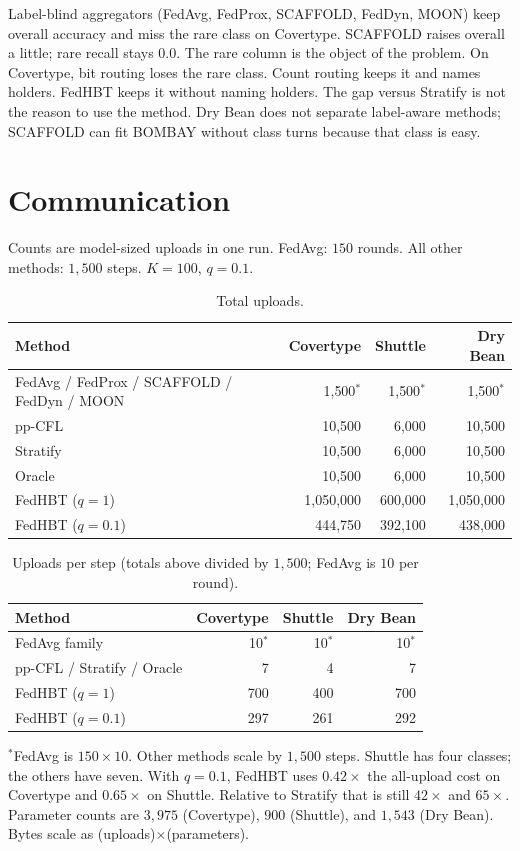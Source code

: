 \documentclass[11pt,a4paper]{article}
\theoremstyle{plain}
\begin{document}
Label-blind aggregators (FedAvg, FedProx, SCAFFOLD, FedDyn, MOON) keep overall accuracy and miss the rare class on Covertype. SCAFFOLD raises overall a little; rare recall stays 0.0. The rare column is the object of the problem. On Covertype, bit routing loses the rare class. Count routing keeps it and names holders. FedHBT keeps it without naming holders. The gap versus Stratify is not the reason to use the method. Dry Bean does not separate label-aware methods; SCAFFOLD can fit BOMBAY without class turns because that class is easy.

\section{Communication}

Counts are model-sized uploads in one run. FedAvg: $150$ rounds. All other methods: $1{,}500$ steps. $K{=}100$, $q{=}0.1$.

\begin{table}[h]
\centering
\caption{Total uploads.}
\begin{tabular}{Lrrr}
\toprule
Method & Covertype & Shuttle & Dry Bean \\
\midrule
FedAvg / FedProx / SCAFFOLD / FedDyn / MOON & 1{,}500$^*$ & 1{,}500$^*$ & 1{,}500$^*$ \\
pp-CFL & 10{,}500 & 6{,}000 & 10{,}500 \\
Stratify & 10{,}500 & 6{,}000 & 10{,}500 \\
Oracle & 10{,}500 & 6{,}000 & 10{,}500 \\
FedHBT ($q{=}1$) & 1{,}050{,}000 & 600{,}000 & 1{,}050{,}000 \\
FedHBT ($q{=}0.1$) & 444{,}750 & 392{,}100 & 438{,}000 \\
\bottomrule
\end{tabular}
\end{table}

\begin{table}[h]
\centering
\caption{Uploads per step (totals above divided by $1{,}500$; FedAvg is $10$ per round).}
\begin{tabular}{Lrrr}
\toprule
Method & Covertype & Shuttle & Dry Bean \\
\midrule
FedAvg family & 10$^*$ & 10$^*$ & 10$^*$ \\
pp-CFL / Stratify / Oracle & 7 & 4 & 7 \\
FedHBT ($q{=}1$) & 700 & 400 & 700 \\
FedHBT ($q{=}0.1$) & 297 & 261 & 292 \\
\bottomrule
\end{tabular}
\end{table}

\noindent
$^*$FedAvg is $150\times 10$. Other methods scale by $1{,}500$ steps. Shuttle has four classes; the others have seven. With $q{=}0.1$, FedHBT uses $0.42\times$ the all-upload cost on Covertype and $0.65\times$ on Shuttle. Relative to Stratify that is still $42\times$ and $65\times$. Parameter counts are $3{,}975$ (Covertype), $900$ (Shuttle), and $1{,}543$ (Dry Bean). Bytes scale as (uploads)$\times$(parameters).
\end{document}
